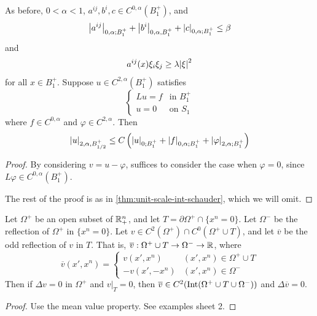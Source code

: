 \documentclass{article}
\begin{document}
\begin{theorem}
     As before, \(0 < \alpha < 1\), \(a^{ij}, b^i, c \in C^{0, \alpha}(B_1^+)\), and
    \[\abs{a^{ij}}_{0, \alpha; B_1^+} + \abs{b^i}_{0, \alpha, B_1^+} + \abs{c}_{0, \alpha; B_1^+} \le \beta\]
    and
    \[a^{ij}(x)\xi_i\xi_j \ge \lambda\abs{\xi}^2\]
    for all \(x \in B_1^+\). Suppose \(u \in C^{2, \alpha}(B_1^+)\) satisfies
    \[\begin{cases}
        Lu = f &\text{in }B_1^+ \\
        u = 0 &\text{on }S_1
    \end{cases}\]
    where \(f \in C^{0, \alpha}\) and \(\varphi \in C^{2, \alpha}\). Then
    \[\abs{u}_{2, \alpha, B_{1/2}^+} \le C\left(\abs{u}_{0; B_1^+} + \abs{f}_{0, \alpha; B_1^+} + \abs{\varphi}_{2, \alpha; B_1^+}\right)\]
\end{theorem}

\begin{proof}
    By considering \(v = u - \varphi\), suffices to consider the case when \(\varphi = 0\), since \(L\varphi \in C^{0, \alpha}(B_1^+)\).

    The rest of the proof is as in \cref{thm:unit-scale-int-schauder}, which we will omit.
\end{proof}

\begin{proposition}
     Let \(\Omega^+\) be an open subset of \(\mathbb{R}^n_+\), and let \(T = \partial\Omega^+ \cap \{x^n = 0\}\). Let \(\Omega^-\) be the reflection of \(\Omega^+\) in \(\{x^n = 0\}\). Let \(v \in C^2(\Omega^+) \cap C^0(\Omega^+ \cup T)\), and let \(\overline{v}\) be the odd reflection of \(v\) in \(T\). That is, \(\overline{v} : \Omega^+ \cup T \to \Omega^- \to \mathbb{R}\), where
    \[\overline v(x', x^n) = \begin{cases}
        v(x', x^n) & (x', x^n) \in \Omega^+ \cup T \\
        -v(x', -x^n) & (x', x^n) \in \Omega^-
    \end{cases}\]
    Then if \(\Delta v = 0\) in \(\Omega^+\) and \(v\vert_T = 0\), then \(\overline{v} \in C^2(\operatorname{Int}(\Omega^+ \cup T \cup \Omega^-))\) and \(\Delta \overline{v} = 0\).
\end{proposition}

\begin{proof}
    Use the mean value property. See examples sheet 2.
\end{proof}
\end{document}

